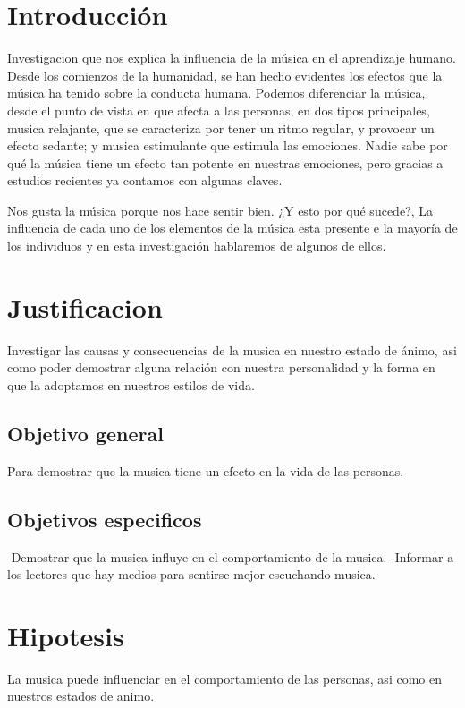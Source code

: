 \documentclass{bmcart}
\begin{document}

\section*{Introducción}

Investigacion que nos explica la influencia de la música en el aprendizaje humano.
Desde los comienzos de la humanidad, se han hecho evidentes los efectos que la música ha tenido sobre la conducta humana.
Podemos diferenciar la música, desde el punto de vista en que afecta a las personas, en dos tipos principales, musica relajante, que se caracteriza por tener un ritmo regular, y provocar un efecto sedante; y musica  estimulante que estimula las emociones. 
Nadie sabe por qué la música tiene un efecto tan potente en nuestras emociones, pero gracias a estudios recientes ya contamos con algunas claves.

Nos gusta la música porque nos hace sentir bien. ¿Y esto por qué sucede?, La influencia de cada uno de los elementos de la música esta presente e  la mayoría de los individuos y en esta investigación hablaremos de algunos de ellos.

\section*{Justificacion}
Investigar las causas y consecuencias de la musica en nuestro estado de ánimo, asi como poder demostrar alguna relación con nuestra personalidad y la forma en que la adoptamos en nuestros estilos de vida.
\subsection*{Objetivo general}
Para demostrar que la musica tiene un efecto en la vida de las personas.
\subsection*{Objetivos especificos}
-Demostrar que la musica influye en el comportamiento de la musica.
\linebreak -Informar a los lectores que hay medios para sentirse mejor escuchando musica.
\section*{Hipotesis}
La musica puede influenciar en el comportamiento de las personas, asi como en nuestros estados de animo.
\end{document}
